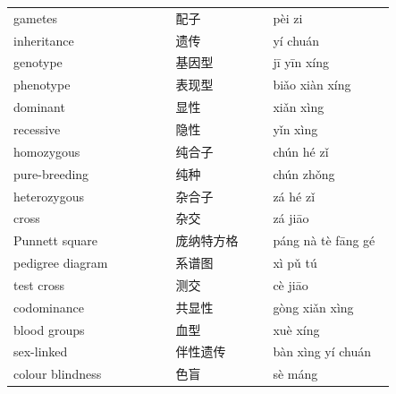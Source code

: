 \documentclass[11pt]{article}
\begin{document}
\begin{longtable}{@{}p{0.40\linewidth}p{0.24\linewidth}p{0.30\linewidth}@{}}
gametes & 配子 & pèi zi \\
inheritance & 遗传 & yí chuán \\
genotype & 基因型 & jī yīn xíng \\
phenotype & 表现型 & biǎo xiàn xíng \\
dominant & 显性 & xiǎn xìng \\
recessive & 隐性 & yǐn xìng \\
homozygous & 纯合子 & chún hé zǐ \\
pure-breeding & 纯种 & chún zhǒng \\
heterozygous & 杂合子 & zá hé zǐ \\
cross & 杂交 & zá jiāo \\
Punnett square & 庞纳特方格 & páng nà tè fāng gé \\
pedigree diagram & 系谱图 & xì pǔ tú \\
test cross & 测交 & cè jiāo \\
codominance & 共显性 & gòng xiǎn xìng \\
blood groups & 血型 & xuè xíng \\
sex-linked & 伴性遗传 & bàn xìng yí chuán \\
colour blindness & 色盲 & sè máng \\
\end{longtable}
\end{document}
